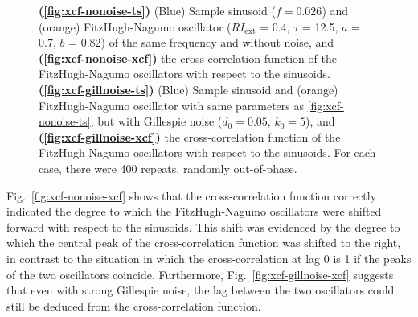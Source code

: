 \begin{figure}
  \caption{
    \textbf{(\ref{fig:xcf-nonoise-ts})}
    (Blue) Sample sinusoid ($f = 0.026$) and (orange) FitzHugh-Nagumo oscillator ($RI_{\mathrm{ext}}$ = 0.4, $\tau$ = 12.5, $a$ = 0.7, $b$ = 0.82) of the same frequency and without noise, and
    \textbf{(\ref{fig:xcf-nonoise-xcf})}
    the cross-correlation function of the FitzHugh-Nagumo oscillators with respect to the sinusoids.
    \textbf{(\ref{fig:xcf-gillnoise-ts})}
    (Blue) Sample sinusoid and (orange) FitzHugh-Nagumo oscillator with same parameters as \ref{fig:xcf-nonoise-ts}, but with Gillespie noise ($d_{0} = 0.05$, $k_{0} = 5$), and
    \textbf{(\ref{fig:xcf-gillnoise-xcf})}
    the cross-correlation function of the FitzHugh-Nagumo oscillators with respect to the sinusoids.
    For each case, there were 400 repeats, randomly out-of-phase.
  }
  \label{fig:xcf}
\end{figure}

Fig.\ \ref{fig:xcf-nonoise-xcf} shows that the cross-correlation function correctly indicated the degree to which the FitzHugh-Nagumo oscillators were shifted forward with respect to the sinusoids.
This shift was evidenced by the degree to which the central peak of the cross-correlation function was shifted to the right, in contrast to the situation in which the cross-correlation at lag 0 is 1 if the peaks of the two oscillators coincide.
Furthermore, Fig.\ \ref{fig:xcf-gillnoise-xcf} suggests that even with strong Gillespie noise, the lag between the two oscillators could still be deduced from the cross-correlation function.




